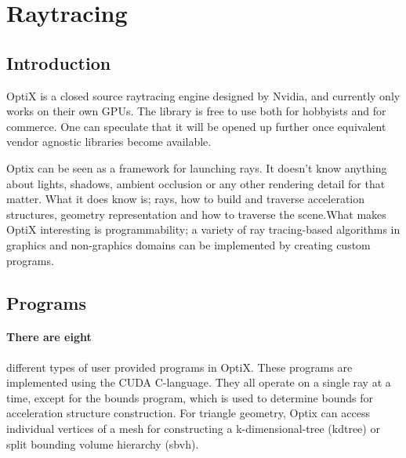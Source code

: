 \section{Raytracing}

\subsection{Introduction}
OptiX is a closed source raytracing engine designed by Nvidia, and currently only works on their own GPUs. The library is free to use both for hobbyists and for commerce. One can speculate that it will be opened up further once equivalent vendor agnostic libraries become available.

Optix can be seen as a framework for launching rays. It doesn't know anything about lights, shadows, ambient occlusion or any other rendering detail for that matter. What it does know is; rays, how to build and traverse acceleration structures, geometry representation and how to traverse the scene.What makes OptiX interesting is programmability; a variety of ray tracing-based algorithms in graphics and non-graphics domains can be implemented \cite{Parker10OptiX} by creating custom programs.

\subsection{Programs}
\paragraph{There are eight} different types of user provided programs in OptiX. These programs are implemented using the CUDA C-language. They all operate on a single ray at a time, except for the bounds program, which is used to determine bounds for acceleration structure construction. For triangle geometry, Optix can access individual vertices of a mesh for constructing a k-dimensional-tree (kdtree) or split bounding volume hierarchy  (sbvh).

